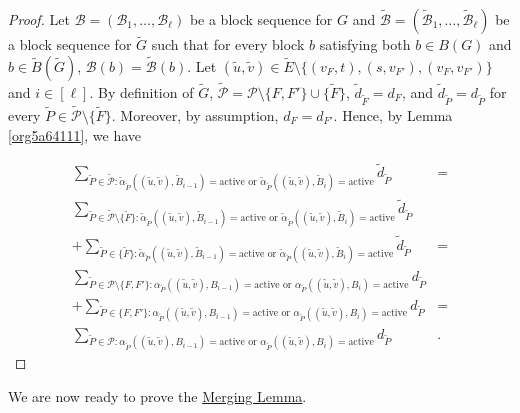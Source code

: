 \documentclass[fontsize=11pt,paper=a4]{book}
\begin{document}
\begin{proof}
Let \(\mathcal{B}=(\mathscr{B}_1,\dots,\mathscr{B}_{\ell})\) be a block sequence for \(G\) and \(\tilde{\mathcal{B}}=(\tilde{\mathscr{B}}_1,\dots,\tilde{\mathscr{B}}_{\ell})\) be a block sequence for \(\tilde{G}\) such that for every block \(b\) satisfying both \(b\in B(G)\) and \(b\in\tilde{B}(\tilde{G})\), \(\mathcal{B}(b)=\tilde{\mathcal{B}}(b)\).
Let \((\tilde{u},\tilde{v})\in\tilde{E}\setminus\{(v_F,t),(s,v_{F'}),(v_F,v_{F'})\}\) and \(i\in[\ell]\).
By definition of \(\tilde{G}\), \(\tilde{\mathcal{P}}=\mathcal{P}\setminus\{F,F'\}\cup\{\tilde{F}\}\), \(\tilde{d}_{\tilde{F}}=d_F\), and \(\tilde{d}_{\tilde{P}}=d_{\tilde{P}}\) for every \(\tilde{P}\in\tilde{\mathcal{P}}\setminus\{\tilde{F}\}\).
Moreover, by assumption, \(d_F=d_{F'}\).
Hence, by Lemma \ref{org5a64111}, we have

\begin{align*}
\sum_{\tilde{P}\in\tilde{\mathcal{P}}:\tilde{\alpha}_{\tilde{P}}((\tilde{u},\tilde{v}),\tilde{B}_{i-1})=\mathrm{active}\text{ or }\tilde{\alpha}_{\tilde{P}}((\tilde{u},\tilde{v}),\tilde{B}_i)=\mathrm{active}}\tilde{d}_{\tilde{P}}&=\\
\sum_{\tilde{P}\in\tilde{\mathcal{P}}\setminus\{\tilde{F}\}:\tilde{\alpha}_{\tilde{P}}((\tilde{u},\tilde{v}),\tilde{B}_{i-1})=\mathrm{active}\text{ or }\tilde{\alpha}_{\tilde{P}}((\tilde{u},\tilde{v}),\tilde{B}_i)=\mathrm{active}}\tilde{d}_{\tilde{P}}&\\
+\sum_{\tilde{P}\in\{\tilde{F}\}:\tilde{\alpha}_{\tilde{P}}((\tilde{u},\tilde{v}),\tilde{B}_{i-1})=\mathrm{active}\text{ or }\tilde{\alpha}_{\tilde{P}}((\tilde{u},\tilde{v}),\tilde{B}_i)=\mathrm{active}}\tilde{d}_{\tilde{P}}&=\\
\sum_{\tilde{P}\in\mathcal{P}\setminus\{F,F'\}:\alpha_{\tilde{P}}((\tilde{u},\tilde{v}),B_{i-1})=\mathrm{active}\text{ or }\alpha_{\tilde{P}}((\tilde{u},\tilde{v}),B_i)=\mathrm{active}}d_{\tilde{P}}&\\
+\sum_{\tilde{P}\in\{F,F'\}:\alpha_{\tilde{P}}((\tilde{u},\tilde{v}),B_{i-1})=\mathrm{active}\text{ or }\alpha_{\tilde{P}}((\tilde{u},\tilde{v}),B_i)=\mathrm{active}}d_{\tilde{P}}&=\\
\sum_{\tilde{P}\in\mathcal{P}:\alpha_{\tilde{P}}((\tilde{u},\tilde{v}),B_{i-1})=\mathrm{active}\text{ or }\alpha_{\tilde{P}}((\tilde{u},\tilde{v}),B_i)=\mathrm{active}}d_{\tilde{P}}&.
\end{align*}
\end{proof}

We are now ready to prove the \hyperref[orgce7cb77]{Merging Lemma}.
\end{document}

